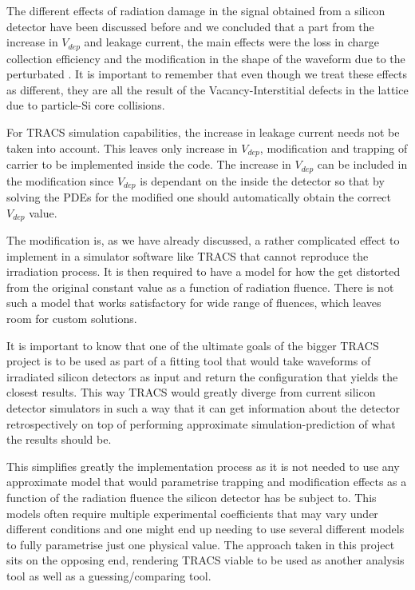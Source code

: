 The different effects of radiation damage in the signal obtained from a silicon detector have been discussed before and we concluded that a part from the increase in $V_{dep}$ and leakage current, the main effects were the loss in charge collection efficiency and the modification in the shape of the waveform due to the perturbated \neff. It is important to remember that even though we treat these effects as different, they are all the result of the Vacancy-Interstitial defects in the lattice due to particle-Si core collisions.

For TRACS simulation capabilities, the increase in leakage current needs not be taken into account. This leaves only increase in $V_{dep}$, \neff modification and trapping of carrier to be implemented inside the code. The increase in $V_{dep}$ can be included in the \neff modification since $V_{dep}$ is dependant on the \neff inside the detector so that by solving the PDEs for the modified \neff one should automatically obtain the correct $V_{dep}$ value.

The \neff modification is, as we have already discussed, a rather complicated effect to implement in a simulator software like TRACS that cannot reproduce the irradiation process. It is then required to have a model for how the \neff get distorted from the original constant value as a function of radiation fluence. There is not such a model that works satisfactory for wide range of fluences, which leaves room for custom solutions. 

It is important to know that one of the ultimate goals of the bigger TRACS project is to be used as part of a fitting tool that would take waveforms of irradiated silicon detectors as input and return the \neff configuration that yields the closest results. This way TRACS would greatly diverge from current silicon detector simulators in such a way that it can get information about the detector retrospectively on top of performing approximate simulation-prediction of what the results should be.

This simplifies greatly the implementation process as it is not needed to use any approximate model that would parametrise trapping and \neff modification effects as a function of the radiation fluence the silicon detector has be subject to. This models often require multiple experimental coefficients that may vary under different conditions and one might end up needing to use several different models to fully parametrise just one physical value. The approach taken in this project sits on the opposing end, rendering TRACS viable to be used as another analysis tool as well as a guessing/comparing tool.

